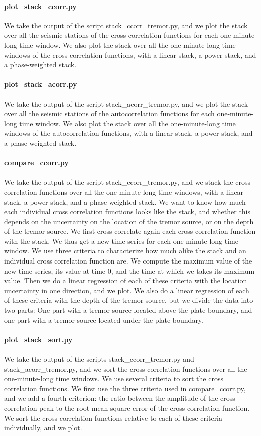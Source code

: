 \documentclass[workdone.tex]{subfiles}
\begin{document}
\paragraph{plot\_stack\_ccorr.py} We take the output of the script stack\_ccorr\_tremor.py, and we plot the stack over all the seismic stations of the cross correlation functions for each one-minute-long time window. We also plot the stack over all the one-minute-long time windows of the cross correlation functions, with  a linear stack, a power stack, and a phase-weighted stack.

\paragraph{plot\_stack\_acorr.py} We take the output of the script stack\_acorr\_tremor.py, and we plot the stack over all the seismic stations of the autocorrelation functions for each one-minute-long time window. We also plot the stack over all the one-minute-long time windows of the autocorrelation functions, with  a linear stack, a power stack, and a phase-weighted stack.

\paragraph{compare\_ccorr.py} We take the output of the script stack\_ccorr\_tremor.py, and we stack the cross correlation functions over all the one-minute-long time windows, with  a linear stack, a power stack, and a phase-weighted stack. We want to know how much each individual cross correlation functions looks like the stack, and whether this depends on the uncertainty on the location of the tremor source, or on the depth of the tremor source. We first cross correlate again each cross correlation function with the stack. We thus get a new time series for each one-minute-long time window.  We use three criteria to characterize how much alike the stack and an individual cross correlation function are. We compute the maximum value of the new time series, its value at time 0, and the time at which we takes its maximum value. Then we do a linear regression of each of these criteria with the location uncertainty in one direction, and we plot. We also do a linear regression of each of these criteria with the depth of the tremor source, but we divide the data into two parts: One part with a tremor source located above the plate boundary, and one part with a tremor source located under the plate boundary.

\paragraph{plot\_stack\_sort.py} We take the output of the scripts stack\_ccorr\_tremor.py and stack\_acorr\_tremor.py, and we sort the cross correlation functions over all the one-minute-long time windows. We use several criteria to sort the cross correlation functions. We first use the three criteria used in compare\_ccorr.py, and we add a fourth criterion: the ratio between the amplitude of the cross-correlation peak to the root mean square error of the cross correlation function. We sort the cross correlation functions relative to each of these criteria individually, and we plot.
\end{document}
